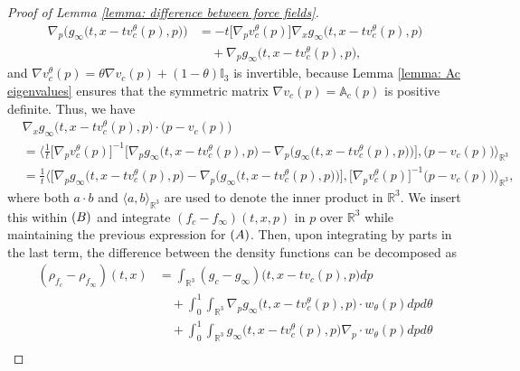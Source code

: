 \documentclass[10pt,a4paper]{amsart}
\begin{document}
\begin{proof}[Proof of Lemma \ref{lemma: difference between force fields}]
$$\begin{aligned}
\nabla_p\Big(g_\infty\Big(t,x-tv_c^\theta(p),p\Big)\Big)&=-t\Big[\nabla_p v_c^\theta(p)\Big]\nabla_xg_\infty\Big(t,x-tv_c^\theta(p),p\Big)\\
&\quad+\nabla_pg_\infty\Big(t,x-tv_c^\theta(p),p\Big),
\end{aligned}$$
and $\nabla v_c^\theta(p)=\theta \nabla v_c(p)+(1-\theta)\mathbb{I}_3$ is invertible, because Lemma \ref{lemma: Ac eigenvalues} ensures that the symmetric matrix $\nabla v_c(p)=\mathbb{A}_c(p)$ is positive definite. Thus, we have
$$\begin{aligned}
&\nabla_xg_\infty\Big(t,x-tv_c^\theta(p),p\Big)\cdot\big(p-v_c(p)\big)\\
&=\bigg\langle\frac{1}{t}\Big[\nabla_p v_c^\theta(p)\Big]^{-1}\bigg[\nabla_p g_\infty\Big(t,x-tv_c^\theta(p),p\Big)-\nabla_p\Big(g_\infty\Big(t,x-tv_c^\theta(p),p\Big)\Big)\bigg],\big(p-v_c(p)\big)\bigg\rangle_{\mathbb{R}^3}\\
&=\frac{1}{t}\bigg\langle\bigg[\nabla_pg_\infty\Big(t,x-tv_c^\theta(p),p\Big)-\nabla_p\Big(g_\infty\Big(t,x-tv_c^\theta(p),p\Big)\Big)\bigg],\Big[\nabla_p v_c^\theta(p)\Big]^{-1}\big(p-v_c(p)\big)\bigg\rangle_{\mathbb{R}^3},
\end{aligned}$$
where both $a\cdot b$ and $\langle a, b\rangle_{\mathbb{R}^3}$ are used to denote the inner product in $\mathbb{R}^3$. We insert this within $\textup{(B)}$ and integrate $(f_c-f_\infty)(t,x,p)$ in $p$ over $\mathbb{R}^3$ while maintaining the previous expression for $(\textup{A})$. Then, upon integrating by parts in the last term, the difference between the density functions can be decomposed as 
$$\begin{aligned}
(\rho_{f_c}-\rho_{f_\infty})(t,x)&=\int_{\mathbb{R}^3}(g_c-g_\infty)\Big(t,x-tv_c(p),p\Big)dp\\
&\quad+\int_0^1\int_{\mathbb{R}^3}\nabla_pg_\infty\Big(t,x-tv_c^\theta(p),p\Big)\cdot w_\theta(p)dpd\theta\\
&\quad+\int_0^1\int_{\mathbb{R}^3}g_\infty\Big(t,x-tv_c^\theta(p),p\Big)\nabla_p\cdot w_\theta(p)dpd\theta\\

\end{aligned}$$
\end{proof}
\end{document}
